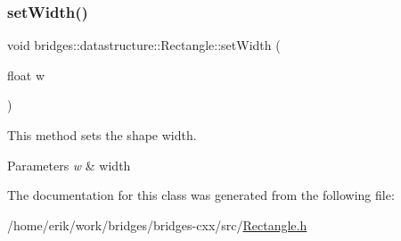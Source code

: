 \subsubsection{\texorpdfstring{set\+Width()}{setWidth()}}
{\footnotesize\ttfamily void bridges\+::datastructure\+::\+Rectangle\+::set\+Width (\begin{DoxyParamCaption}\item[{float}]{w }\end{DoxyParamCaption})\hspace{0.3cm}{\ttfamily [inline]}}



This method sets the shape width. 


\begin{DoxyParams}{Parameters}
{\em w} & width \\
\hline
\end{DoxyParams}


The documentation for this class was generated from the following file\+:\begin{DoxyCompactItemize}
\item 
/home/erik/work/bridges/bridges-\/cxx/src/\hyperlink{_rectangle_8h}{Rectangle.\+h}\end{DoxyCompactItemize}
